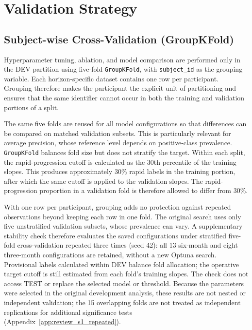 \section{Validation Strategy}
\label{sec:methods_validation}
\subsection{Subject-wise Cross-Validation (GroupKFold)}
\label{sec:methods_groupkfold}
Hyperparameter tuning, ablation, and model comparison are performed only in the \gls{DEV} partition using five-fold \texttt{GroupKFold}, with \texttt{subject\_id} as the grouping variable. Each horizon-specific dataset contains one row per participant. Grouping therefore makes the participant the explicit unit of partitioning and ensures that the same identifier cannot occur in both the training and validation portions of a split.

The same five folds are reused for all model configurations so that differences can be compared on matched validation subsets. This is particularly relevant for average precision, whose reference level depends on positive-class prevalence. \texttt{GroupKFold} balances fold size but does not stratify the target. Within each split, the rapid-progression cutoff is calculated as the 30th percentile of the training slopes. This produces approximately 30\% rapid labels in the training portion, after which the same cutoff is applied to the validation slopes. The rapid-progression proportion in a validation fold is therefore allowed to differ from 30\%.

With one row per participant, grouping adds no protection against repeated observations beyond keeping each row in one fold. The original search uses only five unstratified validation subsets, whose prevalence can vary. A supplementary stability check therefore evaluates the saved configurations under stratified five-fold cross-validation repeated three times (seed 42): all 13 six-month and eight three-month configurations are retained, without a new Optuna search. Provisional labels calculated within DEV balance fold allocation; the operative target cutoff is still estimated from each fold's training slopes. The check does not access TEST or replace the selected model or threshold. Because the parameters were selected in the original development analysis, these results are not nested or independent validation; the 15 overlapping folds are not treated as independent replications for additional significance tests (Appendix~\ref{app:review_s1_repeated}).

